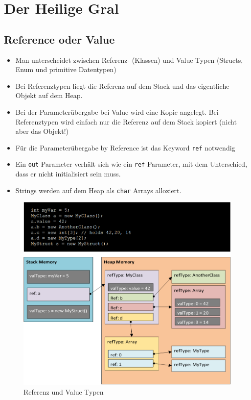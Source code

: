 \documentclass[
a4paper,
oneside,
10pt,
fleqn,
headsepline,
toc=listofnumbered, 
bibliography=totocnumbered]{scrartcl}
\let\stdsection\section
\renewcommand\section{\clearpage\stdsection}
\begin{document}


\lstset{style=visual-studio-style}

\section{Der Heilige Gral}
\subsection{Reference oder Value}
\begin{itemize}
	\item Man unterscheidet zwischen Referenz- (Klassen) und Value Typen (Structs, Enum und primitive Datentypen)
	\item Bei Referenztypen liegt die Referenz auf dem Stack und das eigentliche Objekt auf dem Heap.
	\item Bei der Parameterübergabe bei Value wird eine Kopie angelegt. Bei Referenztypen wird einfach nur die Referenz auf dem Stack kopiert (nicht aber das Objekt!)
	\item Für die Parameterübergabe by Reference ist das Keyword \lstinline|ref| notwendig
	\item Ein \lstinline|out| Parameter verhält sich wie ein \lstinline|ref| Parameter, mit dem Unterschied, dass er nicht initialisiert sein muss.
	\item Strings werden auf dem Heap als \lstinline|char| Arrays alloziert.
\end{itemize}

\begin{figure}[h!]
\centering
\includegraphics[width=0.8\linewidth]{images/reference_value_type}
\caption{Referenz und Value Typen}
\label{fig:valuetypes}
\end{figure}
\end{document}
